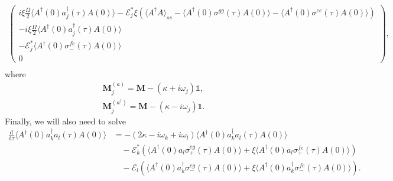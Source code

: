 \documentclass{article}
\newcommand{\ddtau}[1][]{\frac{\mathrm{d} #1}{\mathrm{d}\tau}}
\begin{document}
\begin{subequations}
\begin{align}
\begin{pmatrix}
			i \xi \frac{\Omega}{2} \langle A^{\dagger}(0) a_{j}^{\dagger}(\tau) A(0) \rangle - \mathcal{E}_{j}^{*} \xi \left( \langle A^{\dagger} A \rangle_{ss} - \langle A^{\dagger}(0) \sigma^{gg}(\tau) A(0) \rangle - \langle A^{\dagger}(0) \sigma^{ee}(\tau) A(0) \rangle \right) \\
			-i \xi \frac{\Omega}{2} \langle A^{\dagger}(0) a_{j}^{\dagger}(\tau) A(0) \rangle \\
			-\mathcal{E}_{j}^{*} \langle A^{\dagger}(0) \sigma^{fe}_{-}(\tau) A(0) \rangle \\
			0
		\end{pmatrix} , \\
	\end{align}
\end{subequations}
where
\begin{subequations}
	\begin{gather}
		\bm{M}_{j}^{(a)} = \bm{M} - \left( \kappa + i \omega_{j} \right) \mathbb{1}, \\
		\bm{M}_{j}^{(a^{\dagger})} = \bm{M} - \left( \kappa - i \omega_{j} \right) \mathbb{1}.
	\end{gather}
\end{subequations}
Finally, we will also need to solve
\begin{align}
	\ddtau \langle A^{\dagger}(0) a^{\dagger}_{k} a_{l}(\tau) A(0) \rangle &= -\left( 2 \kappa - i \omega_{k} + i \omega_{l} \right) \langle A^{\dagger}(0) a^{\dagger}_{k} a_{l}(\tau) A(0) \rangle \nonumber \\
	&\quad -\mathcal{E}_{k}^{*} \left( \langle A^{\dagger}(0) a_{l} \sigma^{eg}_{+}(\tau) A(0) \rangle + \xi \langle A^{\dagger}(0) a_{l} \sigma^{fe}_{+}(\tau) A(0) \rangle \right) \nonumber \\
	&\quad - \mathcal{E}_{l} \left( \langle A^{\dagger}(0) a_{k}^{\dagger} \sigma^{eg}_{-}(\tau) A(0) \rangle + \xi \langle A^{\dagger}(0) a_{k}^{\dagger} \sigma^{fe}_{-}(\tau) A(0) \rangle \right).
\end{align}
\end{document}
